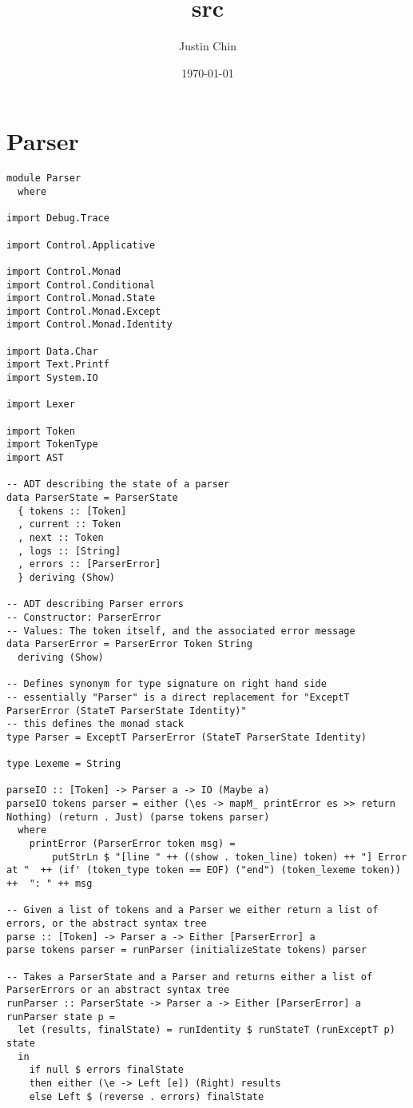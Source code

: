 \documentclass[11pt]{article}
\author{Justin Chin}
\date{\today}
\title{src}
\begin{document}
\maketitle

\section*{Parser}
\label{sec-1}
\begin{verbatim}
module Parser
  where

import Debug.Trace

import Control.Applicative

import Control.Monad
import Control.Conditional
import Control.Monad.State
import Control.Monad.Except
import Control.Monad.Identity

import Data.Char
import Text.Printf
import System.IO

import Lexer

import Token
import TokenType
import AST

-- ADT describing the state of a parser
data ParserState = ParserState
  { tokens :: [Token]
  , current :: Token
  , next :: Token
  , logs :: [String]
  , errors :: [ParserError]
  } deriving (Show)

-- ADT describing Parser errors
-- Constructor: ParserError
-- Values: The token itself, and the associated error message
data ParserError = ParserError Token String
  deriving (Show)

-- Defines synonym for type signature on right hand side
-- essentially "Parser" is a direct replacement for "ExceptT ParserError (StateT ParserState Identity)"
-- this defines the monad stack
type Parser = ExceptT ParserError (StateT ParserState Identity)

type Lexeme = String

parseIO :: [Token] -> Parser a -> IO (Maybe a)
parseIO tokens parser = either (\es -> mapM_ printError es >> return Nothing) (return . Just) (parse tokens parser)
  where
    printError (ParserError token msg) =
        putStrLn $ "[line " ++ ((show . token_line) token) ++ "] Error at "  ++ (if' (token_type token == EOF) ("end") (token_lexeme token)) ++  ": " ++ msg

-- Given a list of tokens and a Parser we either return a list of errors, or the abstract syntax tree
parse :: [Token] -> Parser a -> Either [ParserError] a
parse tokens parser = runParser (initializeState tokens) parser

-- Takes a ParserState and a Parser and returns either a list of ParserErrors or an abstract syntax tree
runParser :: ParserState -> Parser a -> Either [ParserError] a
runParser state p =
  let (results, finalState) = runIdentity $ runStateT (runExceptT p) state
  in
    if null $ errors finalState
    then either (\e -> Left [e]) (Right) results
    else Left $ (reverse . errors) finalState


\end{verbatim}
\end{document}
